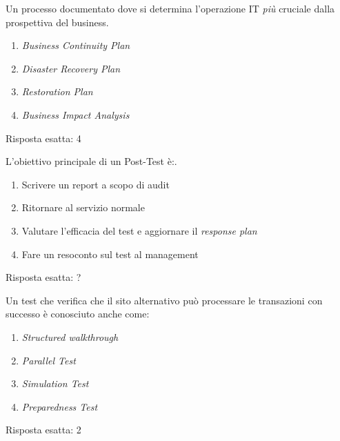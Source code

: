 
\begin{Exercise} [
  title={Quiz},
  label={bcdr8}
 ]

 \Question Un processo documentato dove si determina l'operazione
 IT \emph{più} cruciale dalla prospettiva del business.
 \begin{enumerate}
   \item \textit{Business Continuity Plan}
   \item \textit{Disaster Recovery Plan}
   \item \textit{Restoration Plan}
   \item \textit{Business Impact Analysis}
 \end{enumerate}

\end{Exercise}

\begin{Answer} [
  ref={bcdr8},
  number={8}
 ]

 \Question Risposta esatta: 4
\end{Answer}




\begin{Exercise} [
  title={Quiz},
  label={bcdr9}
 ]

 \Question L'obiettivo principale di un Post-Test è:.
 \begin{enumerate}
   \item Scrivere un report a scopo di audit
   \item Ritornare al servizio normale
   \item Valutare l'efficacia del test e aggiornare il \textit{response
   plan}
   \item Fare un resoconto sul test al management
 \end{enumerate}

\end{Exercise}

\begin{Answer} [
  ref={bcdr9},
  number={9}
 ]

 \Question Risposta esatta: ?
\end{Answer}


\begin{Exercise} [
  title={Quiz},
  label={bcdr10}
 ]

 \Question Un test che verifica che il sito alternativo può processare
 le transazioni con successo è conosciuto anche come:
 \begin{enumerate}
   \item \textit{Structured walkthrough}
   \item \textit{Parallel Test}
   \item \textit{Simulation Test}
   \item \textit{Preparedness Test}
 \end{enumerate}

\end{Exercise}

\begin{Answer} [
  ref={bcdr10},
  number={10}
 ]

 \Question Risposta esatta: 2
\end{Answer}
